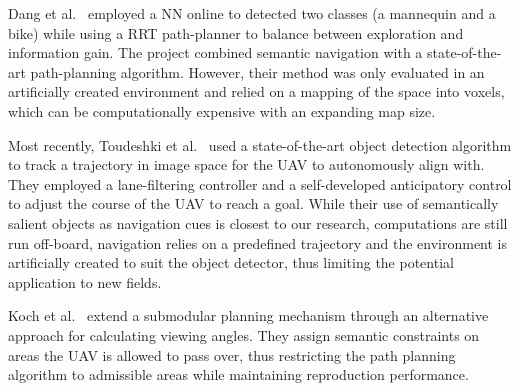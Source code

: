 \documentclass[a4paper,12pt]{article}
\theoremstyle{mytheor}
\begin{document}
Dang et al.~\cite{dang_autonomous_2018} employed a NN online to detected two classes (a mannequin and a bike) while using a RRT path-planner to balance between exploration and information gain. The project combined semantic navigation with a state-of-the-art path-planning algorithm. However, their method was only evaluated in an artificially created environment and relied on a mapping of the space into voxels, which can be computationally expensive with an expanding map size.

Most recently, Toudeshki et al.~\cite{toudeshki_robust_2018} used a state-of-the-art object detection algorithm to track a trajectory in image space for the UAV to autonomously align with. They employed a lane-filtering controller and a self-developed anticipatory control to adjust the course of the UAV to reach a goal. While their use of semantically salient objects as navigation cues is closest to our research, computations are still run off-board, navigation relies on a predefined trajectory and the environment is artificially created to suit the object detector, thus limiting the potential application to new fields.

Koch et al.~\cite{koch_automatic_2019} extend a submodular planning mechanism through an alternative approach for calculating viewing angles. They assign semantic constraints on areas the UAV is allowed to pass over, thus restricting the path planning algorithm to admissible areas while maintaining reproduction performance. 



\end{document}
